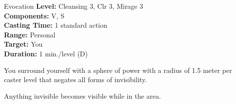 {Evocation}
{
	\textbf{Level:}
	Cleansing 3, Clr 3, Mirage 3\\
	\textbf{Components:}
	V, S\\
	\textbf{Casting Time:}
	1 standard action\\
	\textbf{Range:}
	Personal\\
	\textbf{Target:}
	You\\
	\textbf{Duration:}
	1 min./level (D)\\
}
{
	You surround yourself with a sphere of power with a radius of 1.5 meter per caster level that negates all forms of invisibility.

	Anything invisible becomes visible while in the area.

}
